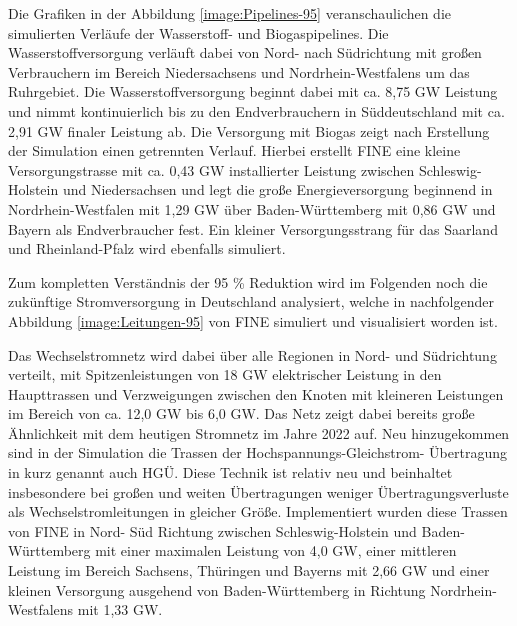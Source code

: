 Die Grafiken in der Abbildung \ref{image:Pipelines-95} veranschaulichen die simulierten Verläufe der Wasserstoff- und Biogaspipelines. Die Wasserstoffversorgung verläuft dabei von Nord- nach Südrichtung mit großen Verbrauchern im Bereich Niedersachsens und Nordrhein-Westfalens um das Ruhrgebiet. Die Wasserstoffversorgung beginnt dabei mit ca. 8,75 GW Leistung und nimmt kontinuierlich bis zu den Endverbrauchern in Süddeutschland mit ca. 2,91 GW finaler Leistung ab. Die Versorgung mit Biogas zeigt nach Erstellung der Simulation einen getrennten Verlauf. Hierbei erstellt FINE eine kleine Versorgungstrasse mit ca. 0,43 GW installierter Leistung zwischen Schleswig-Holstein und Niedersachsen und legt die große Energieversorgung beginnend in Nordrhein-Westfalen mit 1,29 GW über Baden-Württemberg mit 0,86 GW und Bayern als Endverbraucher fest. Ein kleiner Versorgungsstrang für das Saarland und Rheinland-Pfalz wird ebenfalls simuliert.

Zum kompletten Verständnis der 95 \% Reduktion wird im Folgenden noch die zukünftige Stromversorgung in Deutschland analysiert, welche in nachfolgender Abbildung \ref{image:Leitungen-95} von FINE simuliert und visualisiert worden ist.

Das Wechselstromnetz wird dabei über alle Regionen in Nord- und Südrichtung verteilt, mit Spitzenleistungen von 18 GW elektrischer Leistung in den Haupttrassen und Verzweigungen zwischen den Knoten mit kleineren Leistungen im Bereich von ca. 12,0 GW bis 6,0 GW. Das Netz zeigt dabei bereits große Ähnlichkeit mit dem heutigen Stromnetz im Jahre 2022 auf. Neu hinzugekommen sind in der Simulation die Trassen der Hochspannungs-Gleichstrom- Übertragung in kurz genannt auch HGÜ. Diese Technik ist relativ neu und beinhaltet insbesondere bei großen und weiten Übertragungen weniger Übertragungsverluste als Wechselstromleitungen in gleicher Größe. Implementiert wurden diese Trassen von FINE in Nord- Süd Richtung zwischen Schleswig-Holstein und Baden-Württemberg mit einer maximalen Leistung von 4,0 GW, einer mittleren Leistung im Bereich Sachsens, Thüringen und Bayerns mit 2,66 GW und einer kleinen Versorgung ausgehend von Baden-Württemberg in Richtung Nordrhein-Westfalens mit 1,33 GW.

